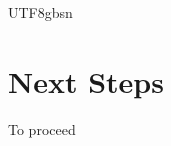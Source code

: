 \documentclass[12pt]{report}
\renewcommand{\bibname}{Références}
\theoremstyle{plain}
\theoremstyle{definition}
\begin{document}
\begin{CJK*}{UTF8}{gbsn}
\section{Next Steps}

To proceed


\def\bibname{References} %

\end{CJK*}
\end{document}
